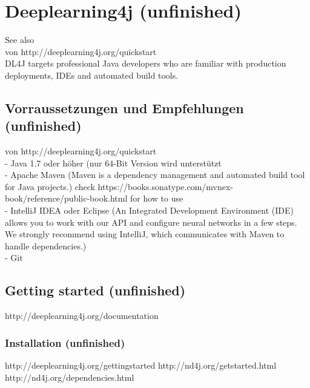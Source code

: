 \chapter{Deeplearning4j (unfinished)}
{See also \cite{DL4J}\\von http://deeplearning4j.org/quickstart\\
DL4J targets professional Java developers who are familiar with production deployments, IDEs and automated build tools.\\

\section{Vorraussetzungen und Empfehlungen (unfinished)}
von http://deeplearning4j.org/quickstart\\
- Java 1.7 oder höher (nur 64-Bit Version wird unterstützt\\
- Apache Maven (Maven is a dependency management and automated build tool for Java projects.) check https://books.sonatype.com/mvnex-book/reference/public-book.html for how to use\\
- IntelliJ IDEA oder Eclipse (An Integrated Development Environment (IDE) allows you to work with our API and configure neural networks in a few steps. We strongly recommend using IntelliJ, which communicates with Maven to handle dependencies.)\\
- Git

\section{Getting started (unfinished)}
http://deeplearning4j.org/documentation

\subsection{Installation (unfinished)}
http://deeplearning4j.org/gettingstarted
http://nd4j.org/getstarted.html
http://nd4j.org/dependencies.html

}
